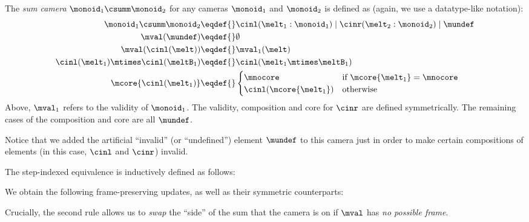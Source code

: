 The \emph{sum camera} $\monoid_1 \csumm \monoid_2$ for any cameras $\monoid_1$ and $\monoid_2$ is defined as (again, we use a datatype-like notation):
\begin{align*}
  \monoid_1 \csumm \monoid_2 \eqdef{}& \cinl(\melt_1:\monoid_1) \mid \cinr(\melt_2:\monoid_2) \mid \mundef \\
  \mval(\mundef) \eqdef{}& \emptyset \\
  \mval(\cinl(\melt)) \eqdef{}& \mval_1(\melt)  \\
  \cinl(\melt_1) \mtimes \cinl(\meltB_1) \eqdef{}& \cinl(\melt_1 \mtimes \meltB_1)  \\
  \mcore{\cinl(\melt_1)} \eqdef{}& \begin{cases}\mnocore & \text{if $\mcore{\melt_1} = \mnocore$} \\ \cinl({\mcore{\melt_1}}) & \text{otherwise} \end{cases}
\end{align*}
Above, $\mval_1$ refers to the validity of $\monoid_1$.
The validity, composition and core for $\cinr$ are defined symmetrically.
The remaining cases of the composition and core are all $\mundef$.

Notice that we added the artificial ``invalid'' (or ``undefined'') element $\mundef$ to this camera just in order to make certain compositions of elements (in this case, $\cinl$ and $\cinr$) invalid.

The step-indexed equivalence is inductively defined as follows:
\begin{mathpar}


\end{mathpar}


We obtain the following frame-preserving updates, as well as their symmetric counterparts:
Crucially, the second rule allows us to \emph{swap} the ``side'' of the sum that the camera is on if $\mval$ has \emph{no possible frame}.

